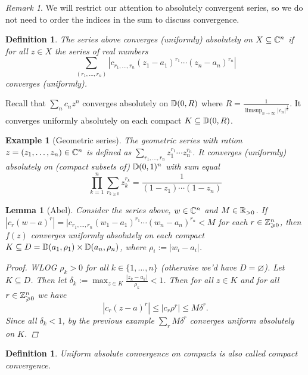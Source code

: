 \documentclass[A4paper, british]{amsart}
\theoremstyle{darkgreentheorem}
\newtheorem{lm}[thm]{Lemma}
\theoremstyle{darkbluedefinition}
\newtheorem{defn}[thm]{Definition}
\theoremstyle{darkredexample}
\newtheorem{exa}[thm]{Example}
\theoremstyle{remark}
\newtheorem{rem}[thm]{Remark}
\newcommand{\1}{\mathbbm{1}}
\begin{document}
\begin{rem}
    We will restrict our attention to absolutely convergent series, so we do not need to order the indices in the sum to discuss convergence.
\end{rem}

\begin{defn}
    The series above \textit{converges (uniformly) absolutely} on $X\subseteq \mathbb{C}^{n}$ if for all $z\in X$ the series of real numbers
    \[\sum_{(r_{1},\ldots,r_{n})} |c_{r_{1},\ldots,r_{n}}(z_{1}-a_{1})^{r_{1}}\cdots (z_{n}-a_{n})^{r_{n}}| \]
    converges (uniformly).
\end{defn}

Recall that $\sum_{n}c_{n}z^{n}$ converges absolutely on $\mathbb{D}(0,R)$ where $R=\frac{1}{\operatorname{limsup}_{n\to\infty}{|c_{n}|^{\frac{1}{n}}}}$.
It converges uniformly absolutely on each compact $K\subseteq \mathbb{D}(0,R)$.

\begin{exa}[Geometric series]
    The geometric series with ration $z=(z_{1},\ldots,z_{n})\in \mathbb{C}^{n}$ is defined as $\sum_{r_{1},\ldots,r_{n}}z_{1}^{r_{1}}\cdots z_{n}^{r_{n}}$.
    It converges (uniformly) absolutely on (compact subsets of) $\mathbb{D}(0,1)^{n}$ with sum equal
    \[ \prod_{k=1}^{n}\sum_{r_{k\geqslant 0}}z_{k}^{r_{k}}=\frac{1}{(1-z_{1})\cdots (1-z_{n})} \]
\end{exa}

\begin{lm}[Abel]
    Consider the series above, $w\in \mathbb{C}^{n}$ and $M\in \mathbb{R}_{>0}$.
    If $|c_{r}(w-a)^{r}|=|c_{r_{1},\ldots,r_{n}}(w_{1}-a_{1})^{r_{1}}\cdots (w_{n}-a_{n})^{r_{n}}<M$ for each $r\in \mathbb{Z}^{n}_{\geqslant 0}$, then $f(z)$ converges uniformly absolutely on each compact $K\subseteq D=\mathbb{D}(a_{1},\rho_{1})\times \mathbb{D}(a_{n},\rho_{n})$, where $\rho_{i}:=|w_{i}-a_{i}|$.
    \begin{proof}
	WLOG $\rho_{k}>0$ for all $k\in \{1,\ldots,n\}$ (otherwise we'd have $D=\varnothing$).
	Let $K\subseteq D$.
	Then let $\delta_{k}:=\max_{z\in K}\frac{|z_{k}-a_{k}|}{\rho_{k}}<1 $.
	Then for all $z\in K$ and for all $r\in \mathbb{Z}^{n}_{\geqslant 0}$ we have
	\[ |c_{r}(z-a)^{r}|\leqslant |c_{r}\rho^{r}|\leqslant M\delta^{r}.\]
	Since all $\delta_{k}<1$, by the previous example $\sum_{r}M\delta^{r}$ converges uniform absolutely on $K$.
    \end{proof}
\end{lm}

\begin{defn}
    Uniform absolute convergence on compacts is also called \textit{compact convergence}.
\end{defn}
\end{document}
